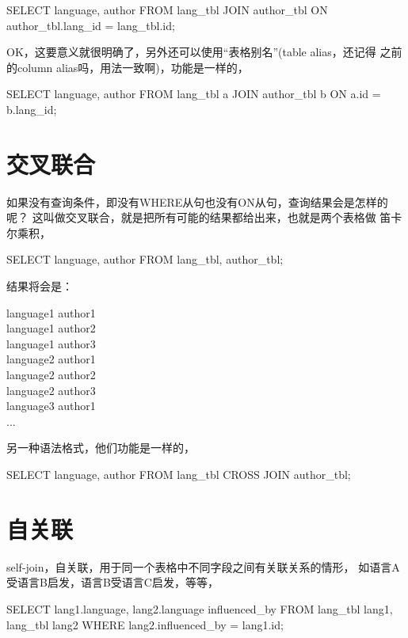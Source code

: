 \documentclass[a4paper,11pt]{article}
\begin{document}
\begin{sqlcode}
SELECT language, author FROM lang_tbl JOIN author_tbl
    ON author_tbl.lang_id = lang_tbl.id;
\end{sqlcode}

OK，这要意义就很明确了，另外还可以使用“表格别名”(table alias，还记得
之前的column alias吗，用法一致啊)，功能是一样的，

\begin{sqlcode}
SELECT language, author FROM lang_tbl a JOIN author_tbl b
    ON a.id = b.lang_id;
\end{sqlcode}

\section[交叉联合]{交叉联合}
如果没有查询条件，即没有WHERE从句也没有ON从句，查询结果会是怎样的呢？
这叫做交叉联合，就是把所有可能的结果都给出来，也就是两个表格做
笛卡尔乘积，

\begin{sqlcode}
SELECT language, author FROM lang_tbl, author_tbl;
\end{sqlcode}

结果将会是：

language1 author1\\
language1 author2\\
language1 author3\\
language2 author1\\
language2 author2\\
language2 author3\\
language3 author1\\
...

另一种语法格式，他们功能是一样的，

\begin{sqlcode}
SELECT language, author FROM lang_tbl CROSS JOIN author_tbl;
\end{sqlcode}

\section[自关联]{自关联}
self-join，自关联，用于同一个表格中不同字段之间有关联关系的情形，
如语言A受语言B启发，语言B受语言C启发，等等，

\begin{sqlcode}
SELECT lang1.language, lang2.language influenced_by
FROM lang_tbl lang1, lang_tbl lang2
WHERE lang2.influenced_by = lang1.id;
\end{sqlcode}
\end{document}
